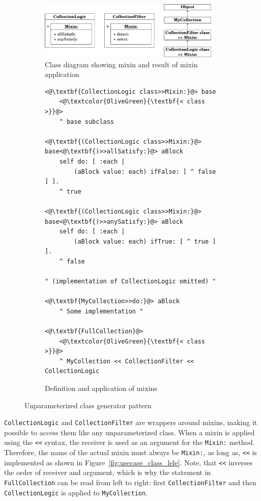 \begin{figure}[!htp]
\begin{subfigure}[b]{\textwidth}
	\centering
	\includegraphics[width=0.95\textwidth]{usecase_classgen.pdf}
	\caption{Class diagram showing mixin and result of mixin application}
\end{subfigure}

\vspace{10pt}

\begin{subfigure}[b]{\textwidth}
\begin{lstlisting}
<@\textbf{CollectionLogic class>>Mixin:}@> base
    <@\textcolor{OliveGreen}{\textbf{< class >}}@>
    ^ base subclass

<@\textbf{(CollectionLogic class>>Mixin:}@> base<@\textbf{)>>allSatisfy:}@> aBlock
    self do: [ :each | 
        (aBlock value: each) ifFalse: [ ^ false ] ].
    ^ true

<@\textbf{(CollectionLogic class>>Mixin:}@> base<@\textbf{)>>anySatisfy:}@> aBlock
    self do: [ :each | 
        (aBlock value: each) ifTrue: [ ^ true ] ].
    ^ false

" (implementation of CollectionLogic omitted) "

<@\textbf{MyCollection>>do:}@> aBlock
    " Some implementation "

<@\textbf{FullCollection}@>
    <@\textcolor{OliveGreen}{\textbf{< class >}}@>
    ^ MyCollection << CollectionFilter << CollectionLogic
\end{lstlisting}
\caption{Definition and application of mixins}
\end{subfigure}
\caption{Unparameterized class generator pattern}
\label{fig:usecase_unparam_class_gen}
\end{figure}

\texttt{CollectionLogic} and \texttt{CollectionFilter} are wrappers around mixins, making it possible to access them like any unparameterized class. When a mixin is applied using the \texttt{<<} syntax, the receiver is used as an argument for the \texttt{Mixin:} method. Therefore, the name of the actual mixin must always be \texttt{Mixin:}, as long as, \texttt{<<} is implemented as shown in Figure~\ref{fig:usecase_class_lele}. Note, that \texttt{<<} inverses the order of receiver and argument, which is why the statement in \texttt{FullCollection} can be read from left to right: first \texttt{CollectionFilter} and then \texttt{CollectionLogic} is applied to \texttt{MyCollection}.

